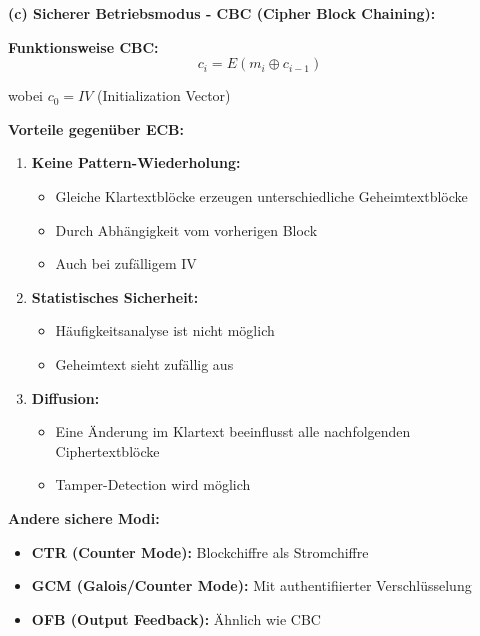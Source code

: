 \documentclass[12pt,a4paper]{article}
\begin{document}
\begin{tcolorbox}[colback=solutionbg, colframe=black!30]

\textbf{(c) Sicherer Betriebsmodus - CBC (Cipher Block Chaining):} \checkmark

\textbf{Funktionsweise CBC:}
$$c_i = E(m_i \oplus c_{i-1})$$

wobei $c_0 = IV$ (Initialization Vector)

\textbf{Vorteile gegenüber ECB:}

\begin{enumerate}[1.]
    \item \textbf{Keine Pattern-Wiederholung:}
    \begin{itemize}
        \item Gleiche Klartextblöcke erzeugen unterschiedliche Geheimtextblöcke
        \item Durch Abhängigkeit vom vorherigen Block
        \item Auch bei zufälligem IV
    \end{itemize}
    
    \item \textbf{Statistisches Sicherheit:}
    \begin{itemize}
        \item Häufigkeitsanalyse ist nicht möglich
        \item Geheimtext sieht zufällig aus
    \end{itemize}
    
    \item \textbf{Diffusion:}
    \begin{itemize}
        \item Eine Änderung im Klartext beeinflusst alle nachfolgenden Ciphertextblöcke
        \item Tamper-Detection wird möglich
    \end{itemize}
\end{enumerate}

\textbf{Andere sichere Modi:}
\begin{itemize}
    \item \textbf{CTR (Counter Mode):} Blockchiffre als Stromchiffre
    \item \textbf{GCM (Galois/Counter Mode):} Mit authentifiierter Verschlüsselung
    \item \textbf{OFB (Output Feedback):} Ähnlich wie CBC
\end{itemize}

\end{tcolorbox}
\end{document}
